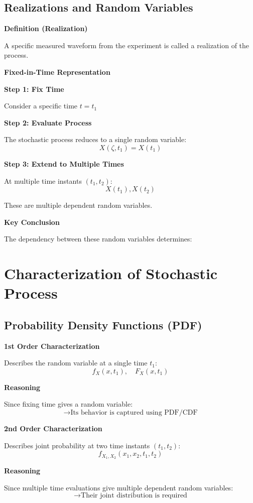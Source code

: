 \documentclass[12pt]{article}
\begin{document}
\subsection{Realizations and Random Variables}

\textbf{Definition (Realization)}  

A specific measured waveform from the experiment is called a realization of the process.

\textbf{Fixed-in-Time Representation}

\textbf{Step 1: Fix Time}  

Consider a specific time $t = t_1$

\textbf{Step 2: Evaluate Process}  

The stochastic process reduces to a single random variable:
\[
X(\zeta, t_1) = X(t_1)
\]

\textbf{Step 3: Extend to Multiple Times}  

At multiple time instants $(t_1, t_2)$:
\[
X(t_1), X(t_2)
\]

These are multiple dependent random variables.

\textbf{Key Conclusion}  

The dependency between these random variables determines:

\section{Characterization of Stochastic Process}

\subsection{Probability Density Functions (PDF)}

\textbf{1st Order Characterization}  

Describes the random variable at a single time $t_1$:
\[
f_X(x, t_1), \quad F_X(x, t_1)
\]

\textbf{Reasoning}  

Since fixing time gives a random variable:
\[
\rightarrow \text{Its behavior is captured using PDF/CDF}
\]

\textbf{2nd Order Characterization}  

Describes joint probability at two time instants $(t_1, t_2)$:
\[
f_{X_1, X_2}(x_1, x_2, t_1, t_2)
\]

\textbf{Reasoning}  

Since multiple time evaluations give multiple dependent random variables:
\[
\rightarrow \text{Their joint distribution is required}
\]
\end{document}
